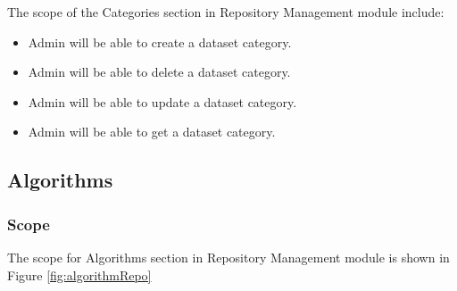 The scope of the Categories section in Repository Management module include:
\begin{itemize}
  \item Admin will be able to create a dataset category.
  \item Admin will be able to delete a dataset category.
  \item Admin will be able to update a dataset category.
  \item Admin will be able to get a dataset category.
\end{itemize}

\subsection{Algorithms}

\subsubsection{Scope}
The scope for Algorithms section in Repository Management module is shown in Figure \ref{fig:algorithmRepo}
